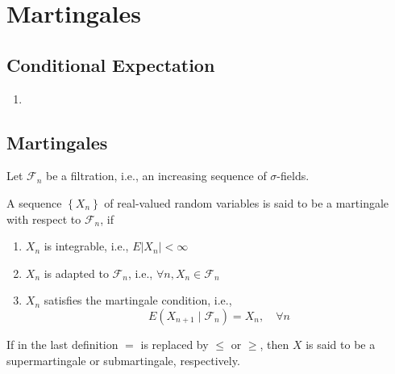 \chapter{Martingales}

\section{Conditional Expectation}

\begin{definition}

\end{definition}

\begin{example}
    \begin{enumerate}
        \item
    \end{enumerate}
\end{example}

\begin{property}
    
\end{property}

\section{Martingales}

Let $\mathcal{F}_{n}$ be a filtration, i.e., an increasing sequence of $\sigma$-fields.
\begin{definition}[Martingale]
    A sequence $\left\{X_{n}\right\}$ of real-valued random variables  is said to be a martingale with respect to $\mathcal{F}_{n}$, if
    \begin{enumerate}
        \item $X_{n}$ is integrable, i.e., $E\left|X_{n}\right|<\infty$
        \item $X_{n}$ is adapted to $\mathcal{F}_{n}$, i.e., $\forall n,X_{n}\in \mathcal{F}_{n}$
        \item $X_{n}$ satisfies the martingale condition, i.e.,
              \begin{equation}
                  E\left(X_{n+1}\mid\mathcal{F}_{n}\right)=X_{n},\quad\forall n
              \end{equation}
    \end{enumerate}
\end{definition}

\begin{note}
    If in the last definition $=$ is replaced by $\leq$ or $\geq$, then $X$ is said to be a supermartingale or submartingale, respectively.
\end{note}

